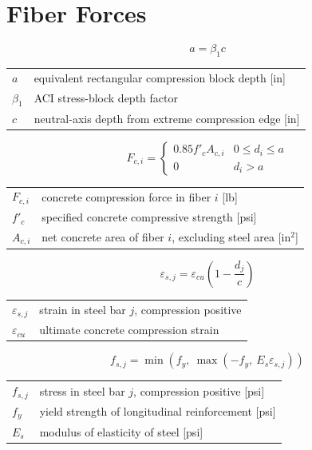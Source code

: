 \documentclass[10pt]{article}
\begin{document}
\section{Fiber Forces}

\begin{equation}
a = \beta_1 c
\end{equation}

{\ttfamily\footnotesize
\begin{tabular}{@{}ll@{}}
$a$ & equivalent rectangular compression block depth [in] \\
$\beta_1$ & ACI stress-block depth factor \\
$c$ & neutral-axis depth from extreme compression edge [in] \\
\end{tabular}
}

\begin{equation}
F_{c,i} =
\begin{cases}
0.85 f'_c A_{c,i} & 0 \leq d_i \leq a \\
0 & d_i > a
\end{cases}
\end{equation}

{\ttfamily\footnotesize
\begin{tabular}{@{}ll@{}}
$F_{c,i}$ & concrete compression force in fiber $i$ [lb] \\
$f'_c$ & specified concrete compressive strength [psi] \\
$A_{c,i}$ & net concrete area of fiber $i$, excluding steel area [in$^2$] \\
\end{tabular}
}

\begin{equation}
\varepsilon_{s,j} = \varepsilon_{cu}\left(1-\frac{d_j}{c}\right)
\end{equation}

{\ttfamily\footnotesize
\begin{tabular}{@{}ll@{}}
$\varepsilon_{s,j}$ & strain in steel bar $j$, compression positive \\
$\varepsilon_{cu}$ & ultimate concrete compression strain \\
\end{tabular}
}

\begin{equation}
f_{s,j} = \min\!\left(f_y,\ \max(-f_y,\ E_s\varepsilon_{s,j})\right)
\end{equation}

{\ttfamily\footnotesize
\begin{tabular}{@{}ll@{}}
$f_{s,j}$ & stress in steel bar $j$, compression positive [psi] \\
$f_y$ & yield strength of longitudinal reinforcement [psi] \\
$E_s$ & modulus of elasticity of steel [psi] \\
\end{tabular}
}
\end{document}
